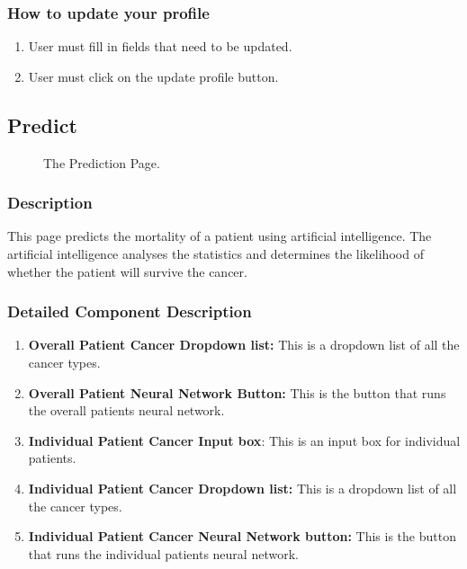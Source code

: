 \documentclass[14pt, a4paper]{article}
\begin{document}
	\subsubsection{How to update your profile}
		\begin{enumerate}
			\item User must fill in fields that need to be updated.
			\item User must click on the update profile button.
		\end{enumerate}
\subsection{Predict}
	\begin{figure}[H]
		\centerline{}
		\caption{The Prediction Page.}
		\label{fig:predict1}
	\end{figure}
	\subsubsection{Description} This page predicts the mortality of a patient using artificial intelligence. The artificial intelligence analyses the statistics and determines the likelihood of whether the patient will survive the cancer.
	\subsubsection{Detailed Component Description}
		\begin{enumerate}
			\item \textbf{Overall Patient Cancer Dropdown list:} This is a dropdown list of all the cancer types.
			\item \textbf{Overall Patient Neural Network Button:} This is the button that runs the overall patients neural network.
			\item \textbf{Individual Patient Cancer Input box}: This is an input box for individual patients.
			\item \textbf{Individual Patient Cancer Dropdown list:} This is a dropdown list of all the cancer types.
			\item \textbf{Individual Patient Cancer Neural Network button:} This is the button that runs the individual patients neural network.
		\end{enumerate}
\end{document}
